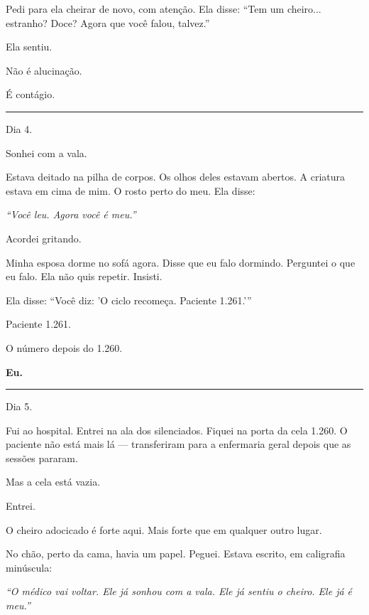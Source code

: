 \noindent Pedi para ela cheirar de novo, com atenção. Ela disse: \textquotedblleft{}Tem um cheiro... estranho? Doce? Agora que você falou, talvez.\textquotedblright{}

\noindent Ela sentiu.

\noindent Não é alucinação.

\noindent É contágio.

\vspace{0.5em}\noindent\rule{\textwidth}{0.5pt}\vspace{0.5em}

\noindent Dia 4.

\noindent Sonhei com a vala.

\noindent Estava deitado na pilha de corpos. Os olhos deles estavam abertos. A criatura estava em cima de mim. O rosto perto do meu. Ela disse:

\noindent \textit{\textquotedblleft{}Você leu. Agora você é meu.\textquotedblright{}}

\noindent Acordei gritando.

\noindent Minha esposa dorme no sofá agora. Disse que eu falo dormindo. Perguntei o que eu falo. Ela não quis repetir. Insisti.

\noindent Ela disse: \textquotedblleft{}Você diz: 'O ciclo recomeça. Paciente 1.261.'\textquotedblright{}

\noindent Paciente 1.261.

\noindent O número depois do 1.260.

\noindent \textbf{Eu.}

\vspace{0.5em}\noindent\rule{\textwidth}{0.5pt}\vspace{0.5em}

\noindent Dia 5.

\noindent Fui ao hospital. Entrei na ala dos silenciados. Fiquei na porta da cela 1.260. O paciente não está mais lá --- transferiram para a enfermaria geral depois que as sessões pararam.

\noindent Mas a cela está vazia.

\noindent Entrei.

\noindent O cheiro adocicado é forte aqui. Mais forte que em qualquer outro lugar.

\noindent No chão, perto da cama, havia um papel. Peguei. Estava escrito, em caligrafia minúscula:

\noindent \textit{\textquotedblleft{}O médico vai voltar. Ele já sonhou com a vala. Ele já sentiu o cheiro. Ele já é meu.\textquotedblright{}}

